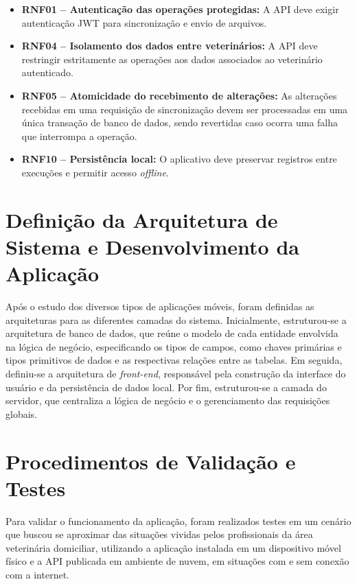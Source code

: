 \begin{itemize}
    \item \textbf{RNF01 -- Autenticação das operações protegidas:} A API deve exigir autenticação JWT para sincronização e envio de arquivos.
    
    \item \textbf{RNF04 -- Isolamento dos dados entre veterinários:} A API deve restringir estritamente as operações aos dados associados ao veterinário autenticado.
    
    \item \textbf{RNF05 -- Atomicidade do recebimento de alterações:} As alterações recebidas em uma requisição de sincronização devem ser processadas em uma única transação de banco de dados, sendo revertidas caso ocorra uma falha que interrompa a operação.
    
    \item \textbf{RNF10 -- Persistência local:} O aplicativo deve preservar registros entre execuções e permitir acesso \textit{offline}.
    
\end{itemize}

\section{Definição da Arquitetura de Sistema e Desenvolvimento da Aplicação}
Após o estudo dos diversos tipos de aplicações móveis, foram definidas as arquiteturas para as diferentes camadas do sistema. Inicialmente, estruturou-se a arquitetura de banco de dados, que reúne o modelo de cada entidade envolvida na lógica de negócio, especificando os tipos de campos, como chaves primárias e tipos primitivos de dados e as respectivas relações entre as tabelas. Em seguida, definiu-se a arquitetura de \textit{front-end}, responsável pela construção da interface do usuário e da persistência de dados local. Por fim, estruturou-se a camada do servidor, que centraliza a lógica de negócio e o gerenciamento das requisições globais.

\section{Procedimentos de Validação e Testes}
Para validar o funcionamento da aplicação, foram realizados testes em um cenário que buscou se aproximar das situações vividas pelos profissionais da área veterinária domiciliar, utilizando a aplicação instalada em um dispositivo móvel físico e a API publicada em ambiente de nuvem, em situações com e sem conexão com a internet.

